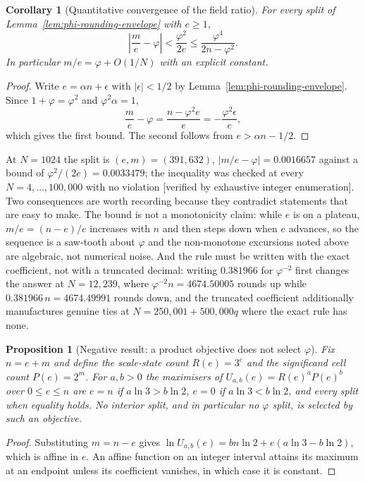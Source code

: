 \documentclass[11pt]{article}
\newtheorem{proposition}[theorem]{Proposition}
\newtheorem{corollary}{Corollary}
\theoremstyle{definition}
\begin{document}
\begin{corollary}[Quantitative convergence of the field ratio]
\label{cor:phi-ratio-bound}
For every split of Lemma~\ref{lem:phi-rounding-envelope} with $e\geq1$,
\[
 \left|\frac{m}{e}-\varphi\right|
 < \frac{\varphi^{2}}{2e}
 \leq \frac{\varphi^{4}}{2n-\varphi^{2}} .
\]
In particular $m/e=\varphi+O(1/N)$ with an explicit constant.
\end{corollary}
\begin{proof}
Write $e=\alpha n+\epsilon$ with $|\epsilon|<1/2$ by
Lemma~\ref{lem:phi-rounding-envelope}. Since $1+\varphi=\varphi^{2}$ and
$\varphi^{2}\alpha=1$,
\[
 \frac{m}{e}-\varphi=\frac{n-\varphi^{2}e}{e}=-\frac{\varphi^{2}\epsilon}{e},
\]
which gives the first bound. The second follows from $e>\alpha n-1/2$.
\end{proof}

At $N=1024$ the split is $(e,m)=(391,632)$, $|m/e-\varphi|=0.0016657$ against a
bound of $\varphi^{2}/(2e)=0.0033479$; the inequality was checked at every
$N=4,\dots,100{,}000$ with no violation [verified by exhaustive integer
enumeration]. Two consequences are worth recording because they contradict
statements that are easy to make. The bound is not a monotonicity claim: while
$e$ is on a plateau, $m/e=(n-e)/e$ increases with $n$ and then steps down when
$e$ advances, so the sequence is a saw-tooth about $\varphi$ and the non-monotone
excursions noted above are algebraic, not numerical noise. And the rule must be
written with the exact coefficient, not with a truncated decimal: writing
$0.381966$ for $\varphi^{-2}$ first changes the answer at $N=12{,}239$, where
$\varphi^{-2}n=4674.50005$ rounds up while $0.381966\,n=4674.49991$ rounds down,
and the truncated coefficient additionally manufactures genuine ties at
$N=250{,}001+500{,}000q$ where the exact rule has none.

\begin{proposition}[Negative result: a product objective does not select
$\varphi$]
\label{prop:phi-product-negative}
Fix $n=e+m$ and define the scale-state count $R(e)=3^{e}$ and the significand
cell count $P(e)=2^{m}$. For $a,b>0$ the maximisers of
$U_{a,b}(e)=R(e)^{a}P(e)^{b}$ over $0\leq e\leq n$ are $e=n$ if
$a\ln3>b\ln2$, $e=0$ if $a\ln3<b\ln2$, and every split when equality holds. No
interior split, and in particular no $\varphi$ split, is selected by such an
objective.
\end{proposition}
\begin{proof}
Substituting $m=n-e$ gives
$\ln U_{a,b}(e)=bn\ln2+e(a\ln3-b\ln2)$, which is affine in $e$. An affine
function on an integer interval attains its maximum at an endpoint unless its
coefficient vanishes, in which case it is constant.
\end{proof}
\end{document}
